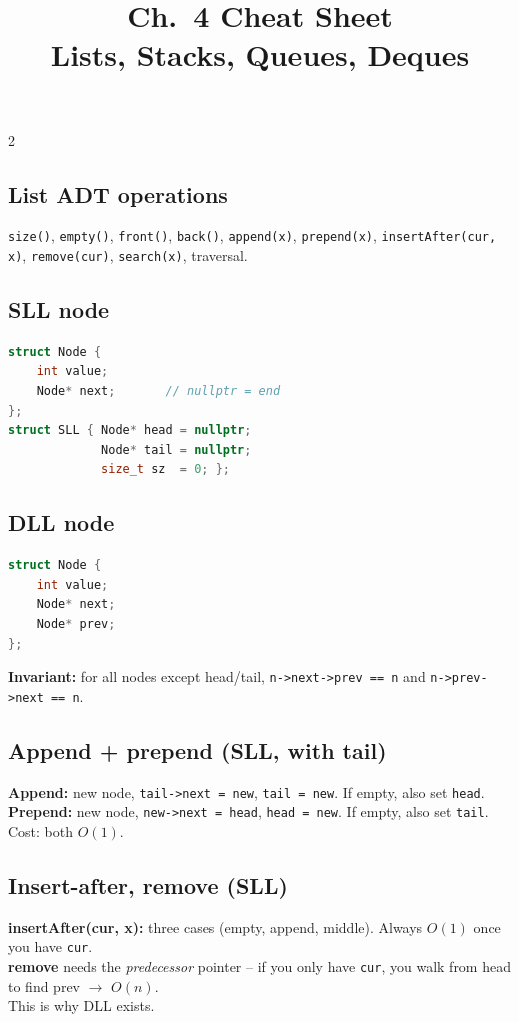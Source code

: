 \documentclass[10pt]{article}
\title{Ch.~4 Cheat Sheet\\\large Lists, Stacks, Queues, Deques}
\author{}
\date{}
\begin{document}
\maketitle
\vspace{-2em}

\begin{multicols}{2}

\subsection*{List ADT operations}
\texttt{size()}, \texttt{empty()}, \texttt{front()}, \texttt{back()},
\texttt{append(x)}, \texttt{prepend(x)}, \texttt{insertAfter(cur, x)},
\texttt{remove(cur)}, \texttt{search(x)}, traversal.

\subsection*{SLL node}
\begin{lstlisting}[language=C++]
struct Node {
    int value;
    Node* next;       // nullptr = end
};
struct SLL { Node* head = nullptr;
             Node* tail = nullptr;
             size_t sz  = 0; };
\end{lstlisting}

\subsection*{DLL node}
\begin{lstlisting}[language=C++]
struct Node {
    int value;
    Node* next;
    Node* prev;
};
\end{lstlisting}
\textbf{Invariant:} for all nodes except head/tail,
\texttt{n->next->prev == n} and \texttt{n->prev->next == n}.

\subsection*{Append + prepend (SLL, with tail)}
\textbf{Append:} new node, \texttt{tail->next = new}, \texttt{tail = new}.
If empty, also set \texttt{head}.\\
\textbf{Prepend:} new node, \texttt{new->next = head}, \texttt{head = new}.
If empty, also set \texttt{tail}.\\
Cost: both $O(1)$.

\subsection*{Insert-after, remove (SLL)}
\textbf{insertAfter(cur, x):} three cases (empty, append, middle). Always
$O(1)$ once you have \texttt{cur}.\\
\textbf{remove} needs the \emph{predecessor} pointer -- if you only have
\texttt{cur}, you walk from head to find prev $\to$ $O(n)$.\\
This is why DLL exists.


\end{multicols}
\end{document}
